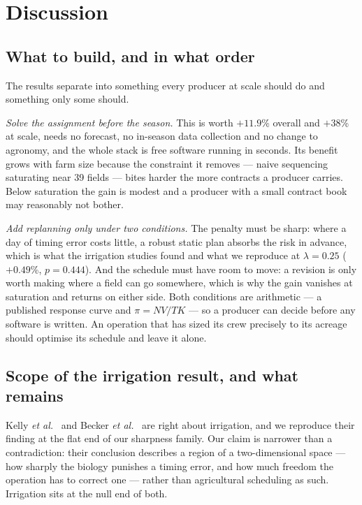 \documentclass[10pt,twocolumn]{article}
\begin{document}
\section{Discussion}

\subsection{What to build, and in what order}

The results separate into something every producer at scale should do
and something only some should.

\emph{Solve the assignment before the season.} This is worth
$+11.9$\% overall and $+38$\% at scale, needs no
forecast, no in-season data collection and no change to agronomy, and
the whole stack is free software running in seconds. Its benefit grows
with farm size because the constraint it removes --- naive sequencing
saturating near 39 fields --- bites harder the more
contracts a producer carries. Below saturation the gain is modest and
a producer with a small contract book may reasonably not bother.

\emph{Add replanning only under two conditions.} The penalty must be
sharp: where a day of timing error costs little, a robust static plan
absorbs the risk in advance, which is what the irrigation studies
found and what we reproduce at $\lambda = 0.25$
($+0.49$\%, $p = 0.444$). And the schedule must have
room to move: a revision is only worth making where a field can go
somewhere, which is why the gain vanishes at saturation and returns on
either side. Both conditions are arithmetic --- a published response
curve and $\pi = NV/TK$ --- so a producer can decide before any
software is written. An operation that has sized its crew precisely
to its acreage should optimise its schedule and leave it alone.

\subsection{Scope of the irrigation result, and what remains}

Kelly \textit{et al.}~\cite{kelly2023} and Becker \textit{et
al.}~\cite{becker2026} are right about irrigation, and we reproduce
their finding at the flat end of our sharpness family. Our claim is
narrower than a contradiction: their conclusion describes a region of
a two-dimensional space --- how sharply the biology punishes a timing
error, and how much freedom the operation has to correct one ---
rather than agricultural scheduling as such. Irrigation sits at the
null end of both.
\end{document}
